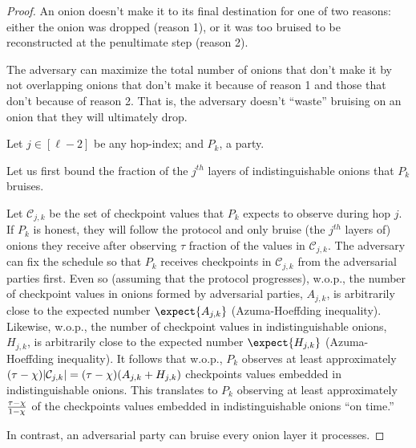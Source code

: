 \documentclass[runningheads,a4paper]{llncs}
\begin{document}
\begin{proof}
An onion doesn't make it to its final destination for one of two reasons: either the onion was dropped (reason 1), or it was too bruised to be reconstructed at the penultimate step (reason 2). 

The adversary can maximize the total number of onions that don't make it by not overlapping onions that don't make it because of reason 1 and those that don't because of reason 2. That is, the adversary doesn't ``waste'' bruising on an onion that they will ultimately drop. 

Let $j \in [\ell-2]$ be any hop-index; and $P_k$, a party. 

Let us first bound the fraction of the $j^\mathit{th}$ layers of indistinguishable onions that $P_k$ bruises. 

Let $\mathcal{C}_{j, k}$ be the set of checkpoint values that $P_k$ expects to observe during hop $j$. 
If $P_k$ is honest, they will follow the protocol and only bruise (the $j^\mathit{th}$ layers of) onions they receive after observing $\tau$ fraction of the values in $\mathcal{C}_{j, k}$. 
The adversary can fix the schedule so that $P_k$ receives checkpoints in $\mathcal{C}_{j, k}$ from the adversarial parties first. 
Even so (assuming that the protocol progresses), 
w.o.p., 
the number of checkpoint values in onions formed by adversarial parties, $A_{j, k}$, is arbitrarily close to the expected number $\expect{A_{j, k}}$ (Azuma-Hoeffding inequality). 
Likewise, w.o.p., 
the number of checkpoint values in indistinguishable onions, $H_{j, k}$, is arbitrarily close to the expected number $\expect{H_{j, k}}$ (Azuma-Hoeffding inequality).
It follows that 
w.o.p., $P_k$ observes at least approximately $(\tau-\chi)|\mathcal{C}_{j,k}| = (\tau-\chi)(A_{j, k} + H_{j, k})$ checkpoints values embedded in indistinguishable onions. This translates to $P_k$ observing at least approximately $\frac{\tau-\chi}{1-\chi}$ of the checkpoints values embedded in indistinguishable onions ``on time.'' 

In contrast, an adversarial party can bruise every onion layer it processes. 


\end{proof}
\end{document}
